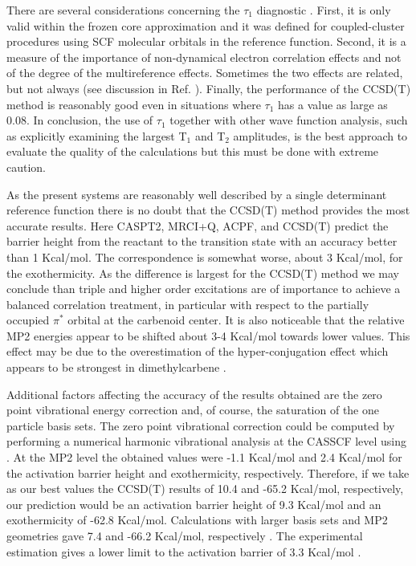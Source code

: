 There are several considerations concerning the $\tau_1$ diagnostic
\cite{Lee:89}. First, it is only valid within the frozen core
approximation and it was defined for coupled-cluster procedures
using SCF molecular orbitals in the reference function. Second, it is 
a measure of the importance of non-dynamical electron correlation effects
and not of the degree of the multireference effects. Sometimes the two
effects are related, but not always (see discussion in Ref. \cite{Lee:92}).
Finally, the performance of the CCSD(T) method is reasonably good even
in situations where $\tau_1$ has a value as large as 0.08.
In conclusion, the use of $\tau_1$ together with other wave function
analysis, such as explicitly examining the largest T$_1$ and T$_2$
amplitudes, is the best approach to evaluate the quality of the
calculations but this must be done with extreme caution.

As the present systems are reasonably well described by a single
determinant reference function there is no doubt that the CCSD(T)
method provides the most accurate results. Here CASPT2, MRCI+Q,
ACPF, and CCSD(T) predict the barrier height from the reactant
to the transition state with an accuracy better than 1 Kcal/mol.
The correspondence is somewhat worse, about 3 Kcal/mol, for the
exothermicity. As the difference is largest for the CCSD(T) method
we may conclude than triple and higher order excitations are of
importance to achieve a balanced correlation treatment, in particular
with respect to the partially occupied $\pi^*$ orbital at the
carbenoid center. It is also noticeable that the relative MP2
energies appear to be shifted about 3-4 Kcal/mol towards lower
values. This effect may be due to the overestimation of the
hyper-conjugation effect which appears to be strongest in dimethylcarbene
\cite{Matzinger:95,Ford:97}.


Additional factors affecting the accuracy of the results obtained
are the zero point vibrational energy correction and, of course,
the saturation of the one particle basis sets. The zero point
vibrational correction could be computed by performing a numerical
harmonic vibrational analysis at the CASSCF level using \molcas.
At the MP2 level \cite{Ford:97} the
obtained values were -1.1 Kcal/mol and 2.4 Kcal/mol for the
activation barrier height and exothermicity, respectively.
Therefore, if we take as our best values the CCSD(T) results
of 10.4 and -65.2 Kcal/mol, respectively, our prediction would
be an activation barrier height of 9.3 Kcal/mol and an
exothermicity of -62.8 Kcal/mol. Calculations with larger
basis sets and MP2 geometries gave 7.4 and -66.2 Kcal/mol,
respectively \cite{Ford:97}. The experimental estimation
gives a lower limit to the activation barrier of 3.3 Kcal/mol
\cite{Ford:97}.

